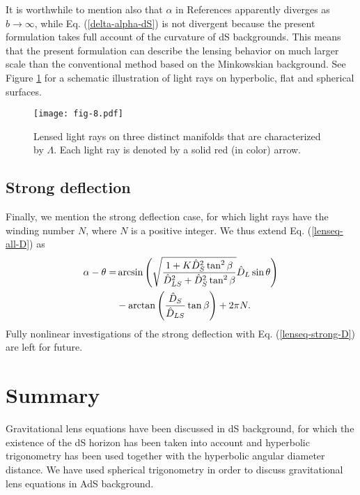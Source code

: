 \documentclass[twocolumn,showpacs,preprintnumbers,amsmath,amssymb]{revtex4-1}
\begin{document}
It is worthwhile to mention also that 
$\alpha$ in References \cite{Ishihara2016, Takizawa2020a} 
apparently diverges as $b \to \infty$, 
while Eq. (\ref{delta-alpha-dS}) is not divergent 
because the present formulation takes full account of 
the curvature of dS backgrounds. 
This means that the present formulation can describe 
the lensing behavior on much larger scale than 
the conventional method based on the Minkowskian background. 
See Figure \ref{fig-topology} for a schematic illustration of 
light rays on hyperbolic, flat and spherical surfaces. 

\begin{figure}
\texttt{[image: fig-8.pdf]}
\caption{
Lensed light rays on three distinct manifolds 
that are characterized by $\Lambda$. 
Each light ray is denoted by a solid red (in color) arrow. 
}
\label{fig-topology}
\end{figure}



\subsection{Strong deflection}
Finally, we mention the strong deflection case, 
for which light rays have the winding number $N$, 
where $N$ is a positive integer. 
We thus extend Eq. (\ref{lenseq-all-D}) as 
\begin{align}
\alpha - \theta 
=& 
\arcsin\left(
\sqrt{
\frac{1 + K \hat D_S^2 \tan^2\beta}{\hat D_{LS}^2 + \hat D_S^2 \tan^2\beta}
}
\hat D_L\sin\theta\right) 
\notag\\
& 
- 
\arctan\left(\frac{\hat D_S}{\hat D_{LS}}\tan\beta\right) 
+ 2\pi N .
\label{lenseq-strong-D}
\end{align}
Fully nonlinear investigations of the strong deflection 
with Eq. (\ref{lenseq-strong-D}) are left for future. 





\section{Summary}
Gravitational lens equations have been discussed in dS background, 
for which the existence of the dS horizon has been taken into account and 
hyperbolic trigonometry has been used together with 
the hyperbolic angular diameter distance. 
We have used spherical trigonometry in order to discuss 
gravitational lens equations in AdS background. 
\end{document}
